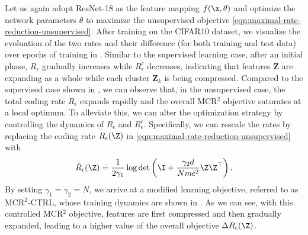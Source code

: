 \documentclass[../../book-main.tex]{subfiles}
\begin{document}
Let us again adopt ResNet-18 as the feature mapping $f(\x,\theta)$ and optimize the network parameters $\theta$ to maximize the unsupervised objective \eqref{eqn:maximal-rate-reduction-unsupervised}. 
After training on the CIFAR10 dataset, we visualize the evoluation of the two rates and their difference (for both training and test data) over epochs of training in . Similar to the supervised learning case, after an initial phase, $R_\epsilon$ gradually increases while $R^c_\epsilon$ decreases, indicating that features $\bm Z$ are expanding as a whole while each cluster $\bm Z_k$ is being compressed. Compared to the supervised case shown in , we can observe that, in the unsupervised case, the total coding rate $R_\epsilon$ expands rapidly and the overall MCR$^2$ objective saturates at a local optimum. To alleviate this, we can alter the optimization strategy by controlling the dynamics of $R_\epsilon$ and $R^c_\epsilon$. Specifically, we can rescale the rates by replacing the coding rate $R_\epsilon(\Z)$ in \eqref{eqn:maximal-rate-reduction-unsupervised} with $$\tilde{R}_\epsilon(\Z) \doteq \frac{1}{2\gamma_1} \log \det \left(\I + \frac{\gamma_2 d}{N m \epsilon^{2}}\Z \Z ^{\top}\right).$$ By setting $\gamma_1 = \gamma_2 = N$, we arrive at a modified learning objective, referred to as MCR$^2$-{\scriptsize CTRL}, whose training dynamics are shown in . As we can see, with this controlled MCR$^2$ objective, features are first compressed and then gradually expanded, leading to a higher value of the overall objective $\Delta R_{\epsilon}(\Z)$.
\end{document}
